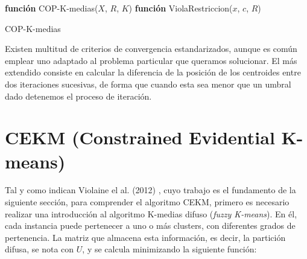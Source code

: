 \begin{algorithm}
	
	\BlankLine
	\BlankLine
	\textbf{función} COP-K-medias($X$, $R$, $K$) 
	\BlankLine
	\BlankLine
	\textbf{función} ViolaRestriccion($x$, $c$, $R$) 
	
	\caption{COP-K-medias}\label{alg:ckm}
\end{algorithm}

Existen multitud de criterios de convergencia estandarizados, aunque es común emplear uno adaptado al problema particular que queramos solucionar. El más extendido consiste en calcular la diferencia de la posición de los centroides entre dos iteraciones sucesivas, de forma que cuando esta sea menor que un umbral dado detenemos el proceso de iteración.

\section{CEKM (Constrained Evidential K-means)}

Tal y como indican Violaine el al. (2012) \cite{CECM:2012}, cuyo trabajo es el fundamento de la siguiente sección, para comprender el algoritmo  \acf{CEKM}, primero es necesario realizar una introducción al algoritmo K-medias difuso (\textit{fuzzy K-means}). En él, cada instancia puede pertenecer a uno o más clusters, con diferentes grados de pertenencia. La matriz que almacena esta información, es decir, la partición difusa, se nota con $U$, y se calcula minimizando la siguiente función:

